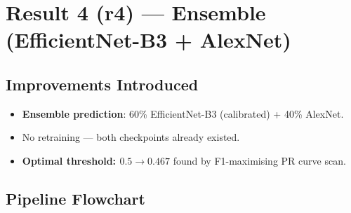 \documentclass[12pt,a4paper]{article}
\begin{document}
\section{Result 4 (r4) --- Ensemble (EfficientNet-B3 + AlexNet)}

\subsection{Improvements Introduced}
\begin{itemize}[nosep]
  \item \colorbox{newbox}{\textbf{Ensemble prediction}}: 60\% EfficientNet-B3 (calibrated) + 40\% AlexNet.
  \item No retraining --- both checkpoints already existed.
  \item \colorbox{newbox}{\textbf{Optimal threshold: $0.5 \to 0.467$}} found by F1-maximising PR curve scan.
\end{itemize}

\subsection{Pipeline Flowchart}
\end{document}
